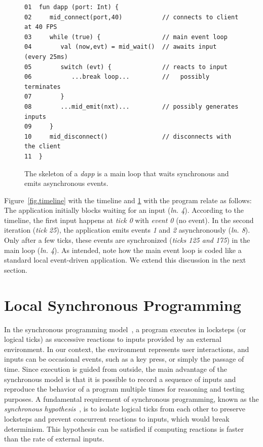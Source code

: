 \documentclass[sigplan,screen]{acmart}
\newcommand{\lin}[1]{(\emph{ln. #1}\xspace)}
\newcommand{\dapp}{\emph{dapp}\xspace}
\begin{document}
\begin{figure}[t]
{\scriptsize
\begin{verbatim}
01  fun dapp (port: Int) {
02     mid_connect(port,40)           // connects to client at 40 FPS
03     while (true) {                 // main event loop
04        val (now,evt) = mid_wait()  // awaits input (every 25ms)
05        switch (evt) {              // reacts to input
06           ...break loop...         //   possibly terminates
07        }
08        ...mid_emit(nxt)...         // possibly generates inputs
09     }
10     mid_disconnect()               // disconnects with the client
11  }
\end{verbatim}
}
  \caption{
    \label{fig.skel}
    The skeleton of a \dapp is a main loop that waits synchronous and emits
    asynchronous events.
  }
\end{figure}

Figure~\ref{fig.timeline} with the timeline and \ref{fig.skel} with the program
relate as follows:
The application initially blocks waiting for an input \lin{4}.
According to the timeline, the first input happens at \emph{tick 0} with
\emph{event 0} (no event).
In the second iteration (\emph{tick 25}), the application emits events \emph{1}
and \emph{2} asynchronously \lin{8}.
Only after a few ticks, these events are synchronized (\emph{ticks 125 and 175})
in the main loop \lin{4}.
As intended, note how the main event loop is coded like a standard local
event-driven application.
We extend this discussion in the next section.

\section{Local Synchronous Programming}
\label{sec.sync}

In the synchronous programming model~\cite{sync}, a program executes in
locksteps (or logical ticks) as successive reactions to inputs provided by an
external environment.
In our context, the environment represents user interactions, and inputs can be
occasional events, such as a key press, or simply the passage of time.
Since execution is guided from outside, the main advantage of the synchronous
model is that it is possible to record a sequence of inputs and reproduce the
behavior of a program multiple times for reasoning and testing purposes.
A fundamental requirement of synchronous programming, known as the
\emph{synchronous hypothesis}~\cite{hypo}, is to isolate logical ticks from
each other to preserve locksteps and prevent concurrent reactions to inputs,
which would break determinism.
This hypothesis can be satisfied if computing reactions is faster than the rate
of external inputs.
\end{document}
